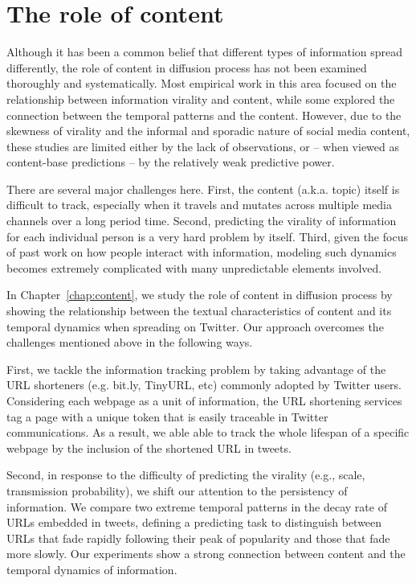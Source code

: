 \documentclass[phd,tocprelim]{cornell}
\begin{document}
\section{The role of content}
Although it has been a common belief that different types of information spread differently, the role of content in diffusion process has not been examined thoroughly and systematically. Most empirical work in this area focused on the relationship between information virality and content\cite{Berger-2010,Hansen:11}, while some explored the connection between the temporal patterns and the content\cite{Gruhl-2004,crane:2008}. However, due to the skewness of virality and the informal and sporadic nature of social media content, these studies are limited either by the lack of observations, or -- when viewed as content-base predictions -- by the relatively weak predictive power. 



There are several major challenges here. First, the content (a.k.a. topic) itself is difficult to track, especially when it travels and mutates across multiple media channels over a long period time\cite{Leskovec-Newscycle-2009}.  Second, predicting the virality of information for each individual person is a very hard problem by itself\cite{Bakshy-2011,Szabo-2010}. Third, given the focus of past work on how people interact with information, modeling such dynamics becomes extremely complicated with many unpredictable elements involved\cite{yang-2010,Yang-2011,Wu-Twitter-2011,Bakshy-2011}. 

In Chapter~\ref{chap:content}, we study the role of content in diffusion process by showing the relationship between the textual characteristics of content and its temporal dynamics when spreading on Twitter. Our approach overcomes the challenges mentioned above in the following ways. 

First, we tackle the information tracking problem by taking advantage of the URL shorteners (e.g. bit.ly, TinyURL, etc) commonly adopted by Twitter users. Considering each webpage as a unit of information, the URL shortening services tag a page with a unique token that is easily traceable in Twitter communications. As a result, we able able to track the whole lifespan of a specific webpage by the inclusion of the shortened URL in tweets. 

Second, in response to the difficulty of predicting the virality (e.g., scale, transmission probability), we shift our attention to the persistency of information. We compare two extreme temporal patterns in the decay rate of URLs embedded in tweets, defining a predicting task to distinguish between URLs that fade rapidly following their peak of popularity and those that fade more slowly. Our experiments show a strong connection between content and the temporal dynamics of information.
\end{document}
